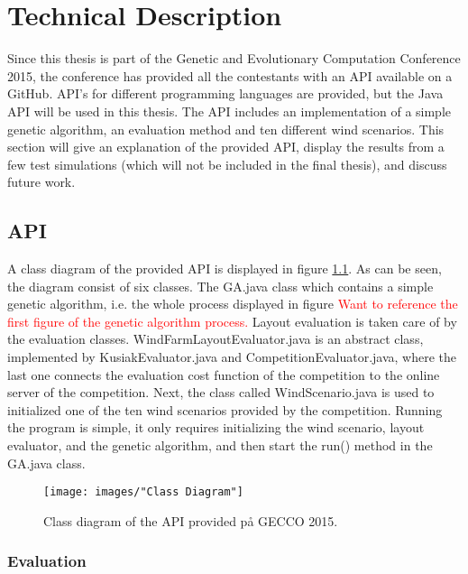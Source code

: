 \chapter{Technical Description}


Since this thesis is part of the Genetic and Evolutionary Computation Conference 2015, the conference has provided all the contestants with an API available on a GitHub. API's for different programming languages are provided, but the Java API will be used in this thesis. The API includes an implementation of a simple genetic algorithm, an evaluation method and ten different wind scenarios. This section will give an explanation of the provided API, display the results from a few test simulations (which will not be included in the final thesis), and discuss future work.


\section{API}


A class diagram of the provided API is displayed in figure \ref{Class Diagram}. As can be seen, the diagram consist of six classes. The GA.java class which contains a simple genetic algorithm, i.e. the whole process displayed in figure \textcolor{red}{Want to reference the first figure of the genetic algorithm process.} Layout evaluation is taken care of by the evaluation classes. WindFarmLayoutEvaluator.java is an abstract class, implemented by KusiakEvaluator.java and CompetitionEvaluator.java, where the last one connects the evaluation cost function of the competition to the online server of the competition. Next, the class called WindScenario.java is used to initialized one of the ten wind scenarios provided by the competition. Running the program is simple, it only requires initializing the wind scenario, layout evaluator, and the genetic algorithm, and then start the run() method in the GA.java class.


\begin{figure}[h!]
\begin{center}
\texttt{[image: images/"Class Diagram"]}
\caption{Class diagram of the API provided på GECCO 2015.}
\label{Class Diagram}
\end{center}
\end{figure}


\subsection{Evaluation}



